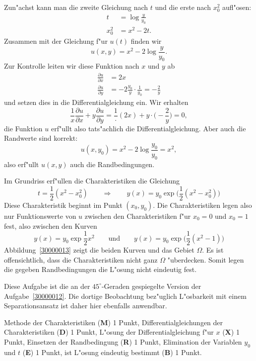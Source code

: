 \begin{loesung}
\begin{teilaufgaben}
Zun"achst kann man die zweite Gleichung nach $t$ und die erste nach $x_0^2$
aufl"osen: 
\begin{align*}
t&=\log\frac{y}{y_0}\\
x_0^2&=x^2-2t.
\end{align*}
Zusammen mit der Gleichung f"ur $u(t)$ finden wir
\[
u(x,y) = x^2 - 2\log\frac{y}{y_0}.
\]
Zur Kontrolle leiten wir diese Funktion nach $x$ und $y$ ab
\begin{align*}
\frac{\partial u}{\partial x}
&=
2x
\\
\frac{\partial u}{\partial y}
&=
-2\frac{y_0}{y}\cdot\frac1{y_0}=-\frac2y
\end{align*}
und setzen dies in die Differentialgleichung ein.
Wir erhalten
\[
\frac1x\frac{\partial u}{\partial x} + y\frac{\partial u}{\partial y}
=
\frac1\cdot (2x)
+
y\cdot \biggl(-\frac{2}{y}\biggr)
=
0,
\]
die Funktion $u$ erf"ullt also tats"achlich die Differentialgleichung.
Aber auch die Randwerte sind korrekt:
\[
u(x, y_0)=x^2-2\log\frac{y_0}{y_0}=x^2,
\]
also erf"ullt $u(x,y)$ auch die Randbedingungen.
\item
Im Grundriss erf"ullen die Charakteristiken die Gleichung
\[
t = \frac12 (x^2-x_0^2)
\qquad\Rightarrow\qquad
y(x)=y_0\exp\biggl(\frac12 (x^2-x_0^2)\biggr)
\]
Diese Charakteristik beginnt im Punkt $(x_0,y_0)$.
Die Charakteristiken legen also nur Funktionswerte von $u$ zwischen
den Charakteristiken f"ur $x_0=0$ und $x_0=1$ fest, also zwischen den Kurven
\[
y(x) = y_0\exp\frac12 x^2
\qquad\text{und}\qquad
y(x) = y_0\exp\biggl(\frac12 (x^2-1)\biggr)
\]
Abbildung~\ref{30000013} zeigt die beiden Kurven und das Gebiet $\Omega$.
Es ist offensichtlich, dass die Charakteristiken nicht ganz $\Omega$
"uberdecken.
Somit legen die gegeben Randbedingungen die L"osung nicht eindeutig fest.
\qedhere
\end{teilaufgaben}
\end{loesung}

\begin{diskussion}
Diese Aufgabe ist die an der $45^\circ$-Geraden gespiegelte Version der
Aufgabe~\ref{30000012}.
Die dortige Beobachtung bez"uglich L"osbarkeit mit einem Separationsansatz ist
daher hier ebenfalls anwendbar.
\end{diskussion}

\begin{bewertung}
Methode der Charakteristiken ({\bf M}) 1 Punkt,
Differentialgleichungen der Charakteristiken ({\bf D}) 1 Punkt,
L"osung der Differentialgleichung f"ur $x$ ({\bf X}) 1 Punkt,
Einsetzen der Randbedingung ({\bf R}) 1 Punkt,
Elimination der Variablen $y_0$ und $t$ ({\bf E}) 1 Punkt,
ist L"osung eindeutig bestimmt ({\bf B}) 1 Punkt.
\end{bewertung}
